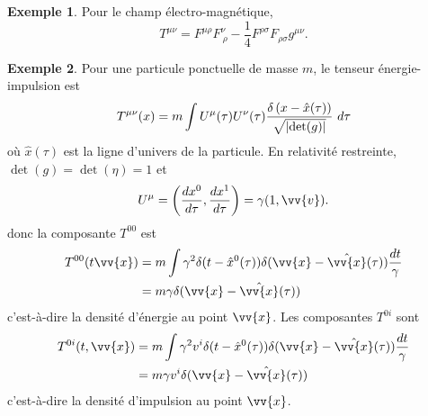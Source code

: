 \documentclass[a4paper,11pt]{report}
\theoremstyle{definition}
\theoremstyle{plain}
\theoremstyle{definition}
\newtheorem{exmp}{Exemple}[chapter]
\theoremstyle{remark}
\begin{document}
            \begin{exmp}
                Pour le champ électro-magnétique, 
                \begin{equation}
                    T^{\mu\nu} = F^{\mu\rho}F^{\nu}_{~\rho}-\frac{1}{4}F^{\rho\sigma}F_{\rho\sigma}g^{\mu\nu}.
                \end{equation}
            \end{exmp}
            
            \begin{exmp}
                Pour une particule ponctuelle de masse $m$, le tenseur énergie-impulsion est
                \begin{equation}
                    T^{\mu\nu}(x) = m\int U^\mu(\tau)U^\nu(\tau)\frac{\delta\left(x-\hat{x}(\tau)\right)}{\sqrt{\abs{\det(g)}}} ~d\tau
                \end{equation}
                où $\hat{x}(\tau)$ est la ligne d'univers de la particule. En relativité restreinte, $\det(g) = \det(\eta) = 1$ et
                \begin{equation}
                    U^\mu = \left( \frac{dx^0}{d\tau},\frac{dx^1}{d\tau} \right) = \gamma(1,\vv{v}).
                \end{equation}
                donc la composante $T^{00}$ est
                \begin{align}
                    T^{00}(t\vv{x}) &= m\int\gamma^2 \delta(t-\hat{x}^0(\tau))\delta(\vv{x}-\hat{\vv{x}}(\tau)) \frac{dt}{\gamma} \\
                    &= m\gamma \delta(\vv{x}-\hat{\vv{x}}(\tau))
                \end{align}
                c'est-à-dire la densité d'énergie au point $\vv{x}$.
                Les composantes $T^{0i}$ sont
                \begin{align}
                    T^{0i}(t,\vv{x}) &= m\int\gamma^2 v^i\delta(t-\hat{x}^0(\tau))\delta(\vv{x}-\hat{\vv{x}}(\tau)) \frac{dt}{\gamma} \\
                    &= m\gamma v^i \delta(\vv{x}-\hat{\vv{x}}(\tau))
                \end{align}
                c'est-à-dire la densité d'impulsion au point $\vv{x}$.\\
                

\end{exmp}
\end{document}

